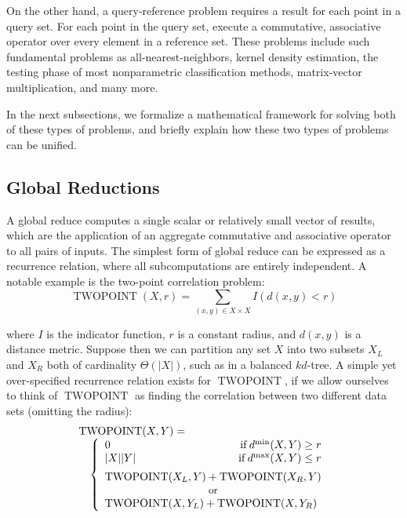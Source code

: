 \documentclass[times, 10pt,twocolumn]{article}
\DeclareMathOperator{\TWOPT}{TWOPOINT}
\DeclareMathOperator{\IF}{if}
\begin{document}
On the other hand, a query-reference problem requires a result for each point in a query set.
For each point in the query set, execute a commutative, associative operator over every element in a reference set.
These problems include such fundamental problems as all-nearest-neighbors, kernel density estimation, the testing phase of most nonparametric classification methods, matrix-vector multiplication, and many more.

In the next subsections, we formalize a mathematical framework for solving both of these types of problems, and briefly explain how these two types of problems can be unified.

\subsection{Global Reductions}

A global reduce computes a single scalar or relatively small vector of results, which are the application of an aggregate commutative and associative operator to all pairs of inputs.
The simplest form of global reduce can be expressed as a recurrence relation, where all subcomputations are entirely independent.
A notable example is the two-point correlation problem:
\begin{equation*}
  \TWOPT(X, r) = \sum_{(x, y) \in X \times X} I(d(x, y) < r)
\end{equation*}

\noindent where $I$ is the indicator function, $r$ is a constant radius, and $d(x, y)$ is a distance metric.
Suppose then we can partition any set $X$ into two subsets $X_L$ and $X_R$ both of cardinality $\Theta(|X|)$, such as in a balanced $kd$-tree.
A simple yet over-specified recurrence relation exists for $\TWOPT$, if we allow ourselves to think of $\TWOPT$ as finding the correlation between two different data sets (omitting the radius):
\begin{equation}
 \begin{array}{ll}
  \lefteqn{\TWOPT(X, Y) =}
  \\
  & \left\{
    \begin{array}{lr}
      0 & \IF d^{\min}(X, Y) \geq r
      \\
      |X||Y| & \IF d^{\max}(X, Y) \leq r
      \vspace{0.07in}
      \\
      \multicolumn{2}{l}{\TWOPT(X_L, Y) + \TWOPT(X_R, Y)}
      \\
      \multicolumn{2}{c}{\scriptstyle{\mbox{\small{or}}}}
      \\
      \multicolumn{2}{l}{\TWOPT(X, Y_L) + \TWOPT(X, Y_R)}
    \end{array}
  \right.
 \end{array}
\end{equation}
\end{document}

